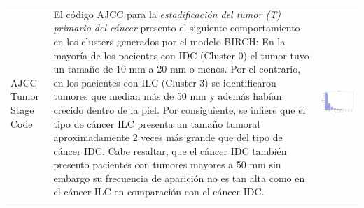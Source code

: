 \begin{table}[htb!]
	\footnotesize
	\begin{threeparttable}
		\begin{tabular}{p{2.5cm} p{7cm} p{6.5cm}} \toprule
			AJCC Tumor Stage Code 
			& 
			El código AJCC para la \textit{estadificación del tumor (T) primario del cáncer} presento el siguiente comportamiento en los clusters generados por el modelo BIRCH: En la mayoría de los pacientes con IDC (Cluster 0) el tumor tuvo un tamaño de 10 mm a 20 mm o menos. Por el contrario, en los pacientes con ILC (Cluster 3) se identificaron tumores que median más de 50 mm y además habían crecido dentro de la piel. Por consiguiente, se infiere que el tipo de cáncer ILC presenta un tamaño tumoral aproximadamente 2 veces más grande que del tipo de cáncer IDC. Cabe resaltar, que el cáncer IDC también presento pacientes con tumores mayores a 50 mm sin embargo su frecuencia de aparición no es tan alta como en el cáncer ILC en comparación con el cáncer IDC.
			& 
			\begin{center}\includegraphics[width=1\linewidth]{NOTEBOOK/IMAGENES_BIRCH_CLUSTERING/4_Cluster_0_tumor_stage_code}\end{center}

\end{tabular}
\end{threeparttable}
\end{table}
